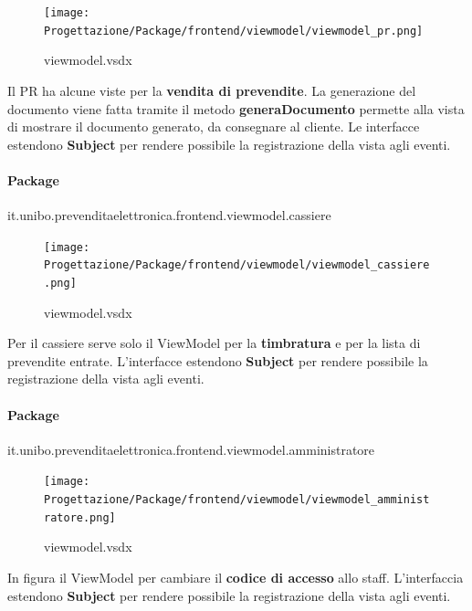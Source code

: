 \documentclass[a4paper]{article}
\begin{document}

\begin{figure}[H]
    \texttt{[image: Progettazione/Package/frontend/viewmodel/viewmodel\_pr.png]}
    \centering
    \caption{viewmodel.vsdx}
\end{figure}

Il PR ha alcune viste per la \textbf{vendita di prevendite}. La generazione del documento viene fatta tramite il metodo \textbf{generaDocumento} permette alla vista di mostrare il documento generato, da consegnare al cliente.  Le interfacce estendono \textbf{Subject} per rendere possibile la registrazione della vista agli eventi.

\paragraph{Package} it.unibo.prevenditaelettronica.frontend.viewmodel.cassiere


\begin{figure}[H]
    \texttt{[image: Progettazione/Package/frontend/viewmodel/viewmodel\_cassiere.png]}
    \centering
    \caption{viewmodel.vsdx}
\end{figure}

Per il cassiere serve solo il ViewModel per la \textbf{timbratura} e per la lista di prevendite entrate. L'interfacce estendono \textbf{Subject} per rendere possibile la registrazione della vista agli eventi.

\newpage

\paragraph{Package} it.unibo.prevenditaelettronica.frontend.viewmodel.amministratore



\begin{figure}[H]
    \texttt{[image: Progettazione/Package/frontend/viewmodel/viewmodel\_amministratore.png]}
    \centering
    \caption{viewmodel.vsdx}
\end{figure}

In figura il ViewModel per cambiare il \textbf{codice di accesso} allo staff. L'interfaccia estendono \textbf{Subject} per rendere possibile la registrazione della vista agli eventi.
\end{document}
